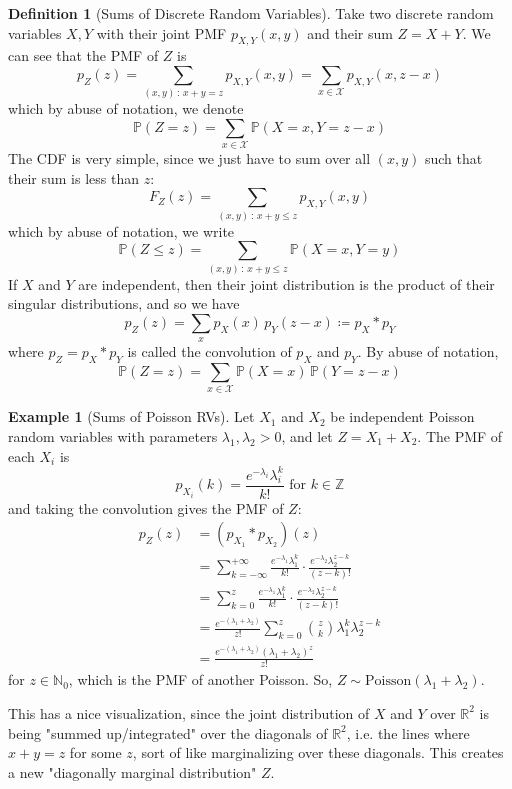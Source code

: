 \documentclass{article}
\theoremstyle{definition}
\newtheorem{example}{Example}[section]
\theoremstyle{remark}
\theoremstyle{definition}
\newtheorem{definition}{Definition}[section]
\begin{document}
\begin{definition}[Sums of Discrete Random Variables]
Take two discrete random variables $X, Y$ with their joint PMF $p_{X, Y} (x, y)$ and their sum $Z = X + Y$. We can see that the PMF of $Z$ is 
\[p_Z (z) = \sum_{(x, y) \,:\, x + y = z} p_{X, Y} (x, y) = \sum_{x \in \mathcal{X}} p_{X, Y} (x, z - x)\]
which by abuse of notation, we denote
\[\mathbb{P}(Z = z) = \sum_{x \in \mathcal{X}} \mathbb{P}(X = x, Y = z - x) \]
The CDF is very simple, since we just have to sum over all $(x, y)$ such that their sum is less than $z$: 
\[F_Z (z) = \sum_{(x, y) \,:\, x + y \leq z} p_{X, Y} (x, y)\]
which by abuse of notation, we write 
\[\mathbb{P}(Z \leq z) = \sum_{(x, y) \,:\, x + y \leq z} \mathbb{P}(X = x, Y = y) \]
If $X$ and $Y$ are independent, then their joint distribution is the product of their singular distributions, and so we have 
\[p_Z (z) = \sum_x p_X (x) \, p_Y (z - x) \coloneqq p_X \ast p_Y\]
where $p_Z = p_X \ast p_Y$ is called the convolution of $p_X$ and $p_Y$. By abuse of notation, 
\[\mathbb{P}(Z = z) = \sum_{x \in \mathcal{X}} \mathbb{P}(X = x) \, \mathbb{P}(Y = z - x) \]
\end{definition}

\begin{example}[Sums of Poisson RVs]
Let $X_1$ and $X_2$ be independent Poisson random variables with parameters $\lambda_1, \lambda_2 > 0$, and let $Z = X_1 + X_2$. The PMF of each $X_i$ is 
\[p_{X_i} (k) = \frac{e^{-\lambda_i} \lambda_i^k}{k!} \text{ for } k \in \mathbb{Z}\]
and taking the convolution gives the PMF of $Z$: 
\begin{align*}
    p_Z (z) & = (p_{X_1} \ast p_{X_2}) (z) \\
    & = \sum_{k=-\infty}^{+\infty} \frac{e^{-\lambda_1} \lambda_1^k}{k!} \cdot \frac{e^{-\lambda_2} \lambda_2^{z - k}}{(z - k)!} \\
    & = \sum_{k=0}^{z} \frac{e^{-\lambda_1} \lambda_1^k}{k!} \cdot \frac{e^{-\lambda_2} \lambda_2^{z - k}}{(z - k)!} \\ 
    & = \frac{e^{-(\lambda_1 + \lambda_2)}}{z!} \sum_{k=0}^z \binom{z}{k} \lambda_1^k \lambda_2^{z - k} \\
    & = \frac{e^{-(\lambda_1 + \lambda_2)} (\lambda_1 + \lambda_2)^z}{z!} 
\end{align*}
for $z \in \mathbb{N}_0$, which is the PMF of another Poisson. So, $Z \sim \mathrm{Poisson}(\lambda_1 + \lambda_2)$. 
\end{example}

This has a nice visualization, since the joint distribution of $X$ and $Y$ over $\mathbb{R}^2$ is being "summed up/integrated" over the diagonals of $\mathbb{R}^2$, i.e. the lines where $x + y = z$ for some $z$, sort of like marginalizing over these diagonals. This creates a new "diagonally marginal distribution" $Z$. 
\end{document}
